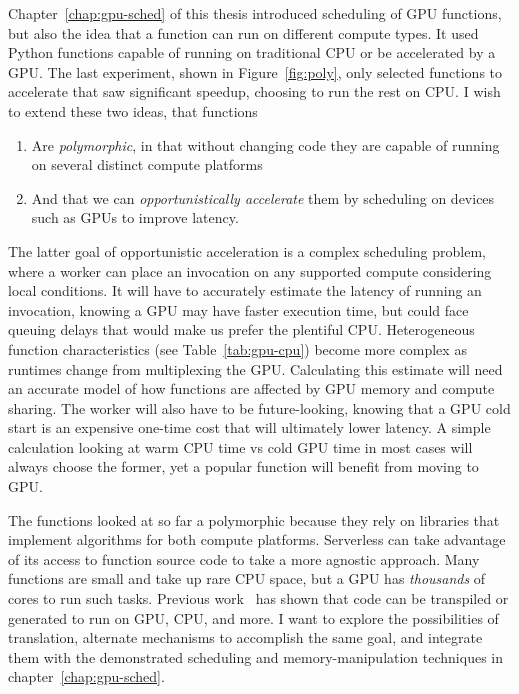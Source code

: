 Chapter~\ref{chap:gpu-sched} of this thesis introduced scheduling of GPU functions, but also the idea that a function can run on different compute types.
It used Python functions capable of running on traditional CPU or be accelerated by a GPU.
The last experiment, shown in Figure~\ref{fig:poly}, only selected functions to accelerate that saw significant speedup, choosing to run the rest on CPU.
I wish to extend these two ideas, that functions
\begin{enumerate}
  \item Are \emph{polymorphic}, in that without changing code they are capable of running on several distinct compute platforms
  \item And that we can \emph{opportunistically accelerate} them by scheduling on devices such as GPUs to improve latency.
\end{enumerate}

The latter goal of opportunistic acceleration is a complex scheduling problem, where a worker can place an invocation on any supported compute considering local conditions.
It will have to accurately estimate the latency of running an invocation, knowing a GPU may have faster execution time, but could face queuing delays that would make us prefer the plentiful CPU.
Heterogeneous function characteristics (see Table~\ref{tab:gpu-cpu}) become more complex as runtimes change from multiplexing the GPU.
Calculating this estimate will need an accurate model of how functions are affected by GPU memory and compute sharing.
The worker will also have to be future-looking, knowing that a GPU cold start is an expensive one-time cost that will ultimately lower latency.
A simple calculation looking at warm CPU time vs cold GPU time in most cases will always choose the former, yet a popular function will benefit from moving to GPU.

The functions looked at so far a polymorphic because they rely on libraries that implement algorithms for both compute platforms.
Serverless can take advantage of its access to function source code to take a more agnostic approach.
Many functions are small and take up rare CPU space, but a GPU has \emph{thousands} of cores to run such tasks.
Previous work~\cite{ginzburg2023vectorvisor,baghdadi2019tiramisu,gpu-to-cpu} has shown that code can be transpiled or generated to run on GPU, CPU, and more.
I want to explore the possibilities of translation, alternate mechanisms to accomplish the same goal, and integrate them with the demonstrated scheduling and memory-manipulation techniques in chapter~\ref{chap:gpu-sched}.

